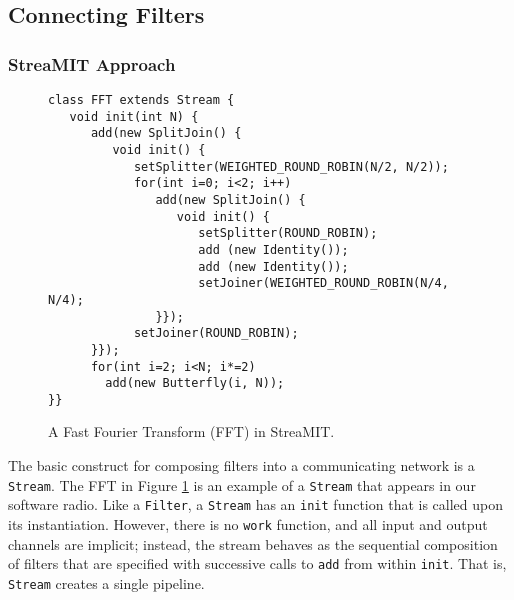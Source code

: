 \subsection{Connecting Filters}
\label{sec:connecting}

\subsubsection{StreaMIT Approach}

\begin{figure}
\scriptsize
\begin{verbatim}
class FFT extends Stream {
   void init(int N) {
      add(new SplitJoin() {
         void init() {
            setSplitter(WEIGHTED_ROUND_ROBIN(N/2, N/2));
            for(int i=0; i<2; i++) 
               add(new SplitJoin() {
                  void init() {
                     setSplitter(ROUND_ROBIN);
                     add (new Identity());
                     add (new Identity());
                     setJoiner(WEIGHTED_ROUND_ROBIN(N/4, N/4);
               }});
            setJoiner(ROUND_ROBIN);
      }});
      for(int i=2; i<N; i*=2)
        add(new Butterfly(i, N));
}}
\end{verbatim}
\vspace{-12pt}
\caption{\protect\small A Fast Fourier Transform (FFT) in StreaMIT.
\protect\label{fig:fft}}
\vspace{-12pt}
\end{figure}

The basic construct for composing filters into a communicating network
is a {\tt Stream}.  The FFT in Figure \ref{fig:fft} is an example of a
{\tt Stream} that appears in our software radio.  Like a {\tt Filter},
a {\tt Stream} has an {\tt init} function that is called upon its
instantiation.  However, there is no {\tt work} function, and all
input and output channels are implicit; instead, the stream behaves as
the sequential composition of filters that are specified with
successive calls to {\tt add} from within {\tt init}.  That is, {\tt
Stream} creates a single pipeline.

